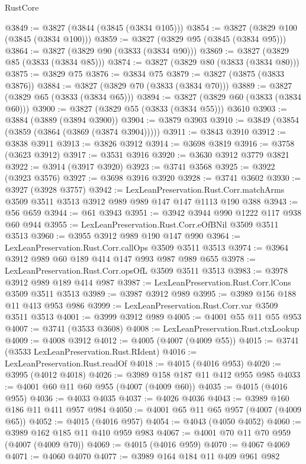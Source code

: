 \begin{lexlean}{RustCore}
\begin{coremodule}
@3849 := @3827 (@3844 (@3845 (@3834 @105)))
@3854 := @3827 (@3829 @100 (@3845 (@3834 @100)))
@3859 := @3827 (@3829 @95 (@3845 (@3834 @95)))
@3864 := @3827 (@3829 @90 (@3833 (@3834 @90)))
@3869 := @3827 (@3829 @85 (@3833 (@3834 @85)))
@3874 := @3827 (@3829 @80 (@3833 (@3834 @80)))
@3875 := @3829 @75
@3876 := @3834 @75
@3879 := @3827 (@3875 (@3833 @3876))
@3884 := @3827 (@3829 @70 (@3833 (@3834 @70)))
@3889 := @3827 (@3829 @65 (@3833 (@3834 @65)))
@3894 := @3827 (@3829 @60 (@3833 (@3834 @60)))
@3900 := @3827 (@3829 @55 (@3833 (@3834 @55))) @3610
@3903 := @3884 (@3889 (@3894 @3900))
@3904 := @3879 @3903
@3910 := @3849 (@3854 (@3859 (@3864 (@3869 (@3874 @3904)))))
@3911 := @3843 @3910
@3912 := @3838 @3911
@3913 := @3826 @3912
@3914 := @3698 @3819
@3916 := @3758 (@3623 @3912)
@3917 := @3531 @3916
@3920 := @3630 @3912 @3779 @3821
@3922 := @3914 (@3917 @3920)
@3923 := @3741 @3568
@3925 := @3922 (@3923 @3576)
@3927 := @3698 @3916 @3920
@3928 := @3741 @3602
@3930 := @3927 (@3928 @3757)
@3942 := LexLeanPreservation.Rust.Corr.matchArms
    @3509
    @3511
    @3513
    @3912
    @989
    @989
    @147
    @147
    @1113
    @190
    @388
@3943 := @56 @659
@3944 := @61 @3943
@3951 := @3942 @3944 @990 @1222 @117 @938 @60 @944
@3955 := LexLeanPreservation.Rust.Corr.eOfBNil @3509 @3511 @3513
@3960 := @3955 @3912 @989 @190 @147 @990
@3964 := LexLeanPreservation.Rust.Corr.callOps @3509 @3511 @3513
@3974 := @3964 @3912 @989 @60 @189 @414 @147 @993 @987 @989 @655
@3978 := LexLeanPreservation.Rust.Corr.opsOfL @3509 @3511 @3513
@3983 := @3978 @3912 @989 @189 @414 @987
@3987 := LexLeanPreservation.Rust.Corr.lCons @3509 @3511 @3513
@3989 := @3987 @3912 @989
@3995 := @3989 @156 @188 @11 @413 @953 @986
@3999 := LexLeanPreservation.Rust.Corr.var @3509 @3511 @3513
@4001 := @3999 @3912 @989
@4005 := @4001 @55 @11 @55 @953
@4007 := @3741 (@3533 @3608)
@4008 := LexLeanPreservation.Rust.ctxLookup
@4009 := @4008 @3912
@4012 := @4005 (@4007 (@4009 @55))
@4015 := @3741 (@3533 LexLeanPreservation.Rust.RIdent)
@4016 := LexLeanPreservation.Rust.readOf
@4018 := @4015 (@4016 @953)
@4020 := @3995 (@4012 @4018)
@4026 := @3989 @158 @187 @11 @412 @955 @985
@4033 := @4001 @60 @11 @60 @955 (@4007 (@4009 @60))
@4035 := @4015 (@4016 @955)
@4036 := @4033 @4035
@4037 := @4026 @4036
@4043 := @3989 @160 @186 @11 @411 @957 @984
@4050 := @4001 @65 @11 @65 @957 (@4007 (@4009 @65))
@4052 := @4015 (@4016 @957)
@4054 := @4043 (@4050 @4052)
@4060 := @3989 @162 @185 @11 @410 @959 @983
@4067 := @4001 @70 @11 @70 @959 (@4007 (@4009 @70))
@4069 := @4015 (@4016 @959)
@4070 := @4067 @4069
@4071 := @4060 @4070
@4077 := @3989 @164 @184 @11 @409 @961 @982

\end{coremodule}
\end{lexlean}
